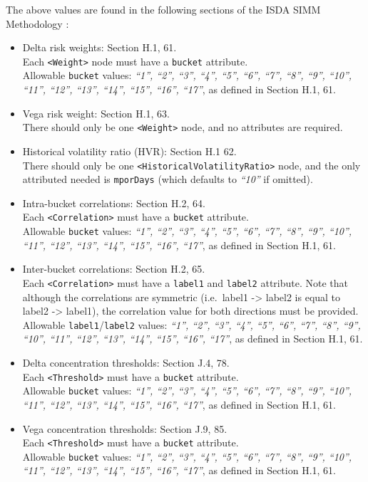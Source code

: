 The above values are found in the following sections of the ISDA SIMM Methodology \cite{SIMM2.6}:
\begin{itemize}
  \item Delta risk weights: Section H.1, 61. \\
    Each {\tt <Weight>} node must have a {\tt bucket} attribute.\\
    Allowable {\tt bucket} values: \emph{``1'', ``2'', ``3'', ``4'', ``5'', ``6'', ``7'', ``8'', ``9'', ``10'', ``11'', ``12'', ``13'', ``14'', ``15'', ``16'', ``17''}, as defined in Section H.1, 61.
  \item Vega risk weight: Section H.1, 63. \\
    There should only be one {\tt <Weight>} node, and no attributes are required.
  \item Historical volatility ratio (HVR): Section H.1 62. \\
    There should only be one {\tt <HistoricalVolatilityRatio>} node, and the only attributed needed is {\tt mporDays} (which defaults to \emph{``10''} if omitted).
  \item Intra-bucket correlations: Section H.2, 64. \\
    Each {\tt <Correlation>} must have a {\tt bucket} attribute. \\
    Allowable {\tt bucket} values: \emph{``1'', ``2'', ``3'', ``4'', ``5'', ``6'', ``7'', ``8'', ``9'', ``10'', ``11'', ``12'', ``13'', ``14'', ``15'', ``16'', ``17''}, as defined in Section H.1, 61.
  \item Inter-bucket correlations: Section H.2, 65. \\
    Each {\tt <Correlation>} must have a {\tt label1} and {\tt label2} attribute. Note that although the correlations
    are symmetric (i.e.\ label1 -> label2 is equal to label2 -> label1), the correlation value for both directions must be
    provided. \\
    Allowable {\tt label1}/{\tt label2} values: \emph{``1'', ``2'', ``3'', ``4'', ``5'', ``6'', ``7'', ``8'', ``9'', ``10'', ``11'', ``12'', ``13'', ``14'', ``15'', ``16'', ``17''}, as defined in Section H.1, 61.
  \item Delta concentration thresholds: Section J.4, 78. \\
    Each {\tt <Threshold>} must have a {\tt bucket} attribute. \\
    Allowable {\tt bucket} values: \emph{``1'', ``2'', ``3'', ``4'', ``5'', ``6'', ``7'', ``8'', ``9'', ``10'', ``11'', ``12'', ``13'', ``14'', ``15'', ``16'', ``17''}, as defined in Section H.1, 61.
  \item Vega concentration thresholds: Section J.9, 85. \\
    Each {\tt <Threshold>} must have a {\tt bucket} attribute. \\
    Allowable {\tt bucket} values: \emph{``1'', ``2'', ``3'', ``4'', ``5'', ``6'', ``7'', ``8'', ``9'', ``10'', ``11'', ``12'', ``13'', ``14'', ``15'', ``16'', ``17''}, as defined in Section H.1, 61.
\end{itemize}

